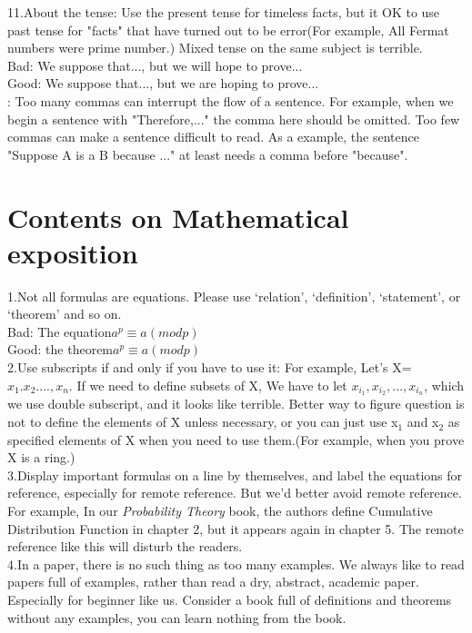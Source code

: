 \documentclass[]{article}
\begin{document}
	\noindent11.About the tense: Use the present tense for timeless facts, but it OK to use past tense for "facts" that have turned out to be error(For example, All Fermat numbers were prime number.) Mixed tense on the same subject is terrible.\\
	\indent Bad: We suppose that..., but we will hope to prove...\\
	\indent Good: We suppose that..., but we are hoping to prove...\\
	
	: Too many commas can interrupt the flow of a sentence. For example, when we begin a sentence with "Therefore,..." the comma here should be omitted. Too few commas can make a sentence difficult to read. As a example, the sentence "Suppose A is a B because ..." at least needs a comma before "because".
	
	
	\section{Contents on Mathematical exposition} 
	1.Not all formulas are equations. Please use `relation', `definition', `statement', or `theorem' and so on.\\
	\indent Bad: The equation\quad\(a^{p}\equiv a(mod p)\)\\
	\indent Good: the theorem\quad\(a^{p}\equiv a(mod p)
	\) \\ 
	
	\noindent2.Use subscripts if and only if you have to use it: For example, Let's X={\(x_1.x_2...., x_n\)}. If we need to define subsets of X, We have to let {\(x_{i_1}, x_{i_2}, ..., x_{i_n}\)}, which we use double subscript, and it looks like terrible. Better way to figure question is not to define the elements of X unless necessary, or you can just use x$_1$ and x$_2$ as specified elements of X when you need to use them.(For example, when you prove X is a ring.)\\
	
	\noindent3.Display important formulas on a line by themselves, and label the equations for reference, especially for remote reference. But we'd better avoid remote reference. For example, In our \textit{Probability Theory} book, the authors define Cumulative Distribution Function in chapter 2, but it appears again in chapter 5. The remote reference like this will disturb the readers. \\
	
	\noindent 4.In a paper, there is no such thing as too many examples. We always like to read papers full of examples, rather than read a dry, abstract, academic paper. Especially for beginner like us. Consider a book full of definitions and theorems without any examples, you can learn nothing from the book.\\
	
\end{document}

